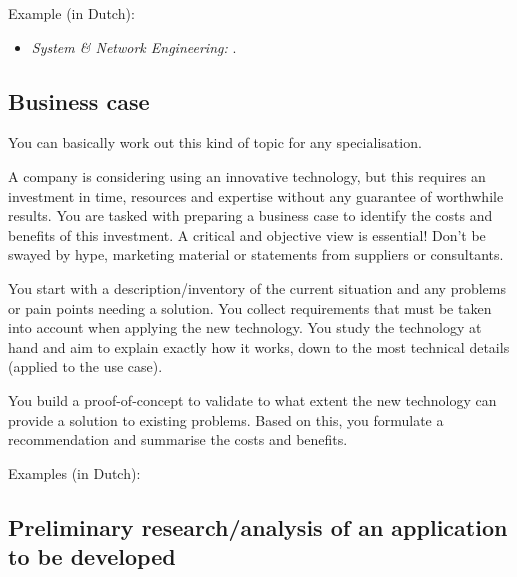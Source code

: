 Example (in Dutch):

\begin{itemize}
	\item \emph{System \& Network Engineering:}  \autocite{VanDamme2021}.
\end{itemize}

\subsection{Business case}%
\label{ssec:thesis_type_business_case}

You can basically work out this kind of topic for any specialisation.

A company is considering using an innovative technology, but this requires an investment in time, resources and expertise without any guarantee of worthwhile results. You are tasked with preparing a business case to identify the costs and benefits of this investment. A critical and objective view is essential! Don't be swayed by hype, marketing material or statements from suppliers or consultants.

You start with a description/inventory of the current situation and any problems or pain points needing a solution. You collect requirements that must be taken into account when applying the new technology. You study the technology  at hand and aim to explain exactly how it works, down to the most technical details (applied to the use case).

You build a proof-of-concept to validate to what extent the new technology can provide a solution to existing problems. Based on this, you formulate a recommendation and summarise the costs and benefits.

Examples (in Dutch):

\begin{itemize}
	\item \emph{Mainframe Expert:} } \autocite{Coucke2020}.
	\item \emph{System \& Network Engineering:} \citetitle{Vanduynslager2024} \autocite{Vanduynslager2024}}
\end{itemize}

\subsection{Preliminary research/analysis of an application to be developed}%
\label{ssec:thesis_type_application_analysis}


